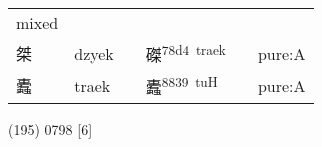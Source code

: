 \documentclass[14pt,a4paper]{scrartcl}
\begin{document}
\begin{longtable}[c]{@{}llllll@{}}
\begin{minipage}[t]{0.14\columnwidth}
mixed
\strut\end{minipage}\tabularnewline
\begin{minipage}[t]{0.14\columnwidth}\raggedright\strut
桀
\strut\end{minipage} &
\begin{minipage}[t]{0.14\columnwidth}\raggedright\strut
dzyek
\strut\end{minipage} &
\begin{minipage}[t]{0.14\columnwidth}\raggedright\strut
\strut\end{minipage} &
\begin{minipage}[t]{0.14\columnwidth}\raggedright\strut
磔\textsuperscript{78d4~traek}
\strut\end{minipage} &
\begin{minipage}[t]{0.14\columnwidth}\raggedright\strut
\strut\end{minipage} &
\begin{minipage}[t]{0.14\columnwidth}\raggedright\strut
pure:A
\strut\end{minipage}\tabularnewline
\begin{minipage}[t]{0.14\columnwidth}\raggedright\strut
蠹
\strut\end{minipage} &
\begin{minipage}[t]{0.14\columnwidth}\raggedright\strut
traek
\strut\end{minipage} &
\begin{minipage}[t]{0.14\columnwidth}\raggedright\strut
\strut\end{minipage} &
\begin{minipage}[t]{0.14\columnwidth}\raggedright\strut
蠹\textsuperscript{8839~tuH}
\strut\end{minipage} &
\begin{minipage}[t]{0.14\columnwidth}\raggedright\strut
\strut\end{minipage} &
\begin{minipage}[t]{0.14\columnwidth}\raggedright\strut
pure:A
\strut\end{minipage}\tabularnewline
\bottomrule
\end{longtable}

(195) 0798 {[}6{]}
\end{document}
